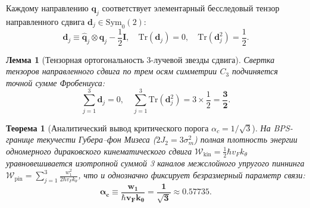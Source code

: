 \documentclass[12pt,a4paper]{article}
\newtheorem{theorem}{Теорема}
\newtheorem{lemma}{Лемма}
\begin{document}
	Каждому направлению $\mathbf{q}_j$ соответствует элементарный бесследовый тензор направленного сдвига $\mathbf{d}_j \in \mathrm{Sym}_0(2)$:
	\begin{equation}
		\mathbf{d}_j \equiv \hat{\mathbf{q}}_j \otimes \hat{\mathbf{q}}_j - \frac{1}{2}\mathbf{I}, \quad \mathrm{Tr}(\mathbf{d}_j) = 0, \quad \mathrm{Tr}(\mathbf{d}_j^2) = \frac{1}{2}.
	\end{equation}
	
	\begin{lemma}[Тензорная ортогональность 3-лучевой звезды сдвига]
		Свертка тензоров направленного сдвига по трем осям симметрии $C_3$ подчиняется точной сумме Фробениуса:
		\begin{equation}
			\sum_{j=1}^3 \mathbf{d}_j = 0, \quad \sum_{j=1}^3 \mathrm{Tr}(\mathbf{d}_j^2) = 3 \times \frac{1}{2} = \mathbf{\frac{3}{2}}.
		\end{equation}
	\end{lemma}
	
	\begin{theorem}[Аналитический вывод критического порога $\alpha_c = 1/\sqrt{3}$]
		На BPS-границе текучести Губера--фон Мизеса ($2J_2 = 3\sigma_m^2$) полная плотность энергии одномерного дираковского кинематического сдвига $\mathcal{W}_{\mathrm{kin}} = \frac{1}{2} \hbar v_F k_\theta$ уравновешивается изотропной суммой 3 каналов межслойного упругого пиннинга $\mathcal{W}_{\mathrm{pin}} = \sum_{j=1}^3 \frac{w_1^2}{2 \hbar v_F k_\theta}$, что и однозначно фиксирует безразмерный параметр связи:
		\begin{equation}
			\mathbf{\alpha_c \equiv \frac{w_1}{\hbar v_F k_\theta} = \frac{1}{\sqrt{3}} \approx 0.57735}.
		\end{equation}
	\end{theorem}
	
\end{document}
